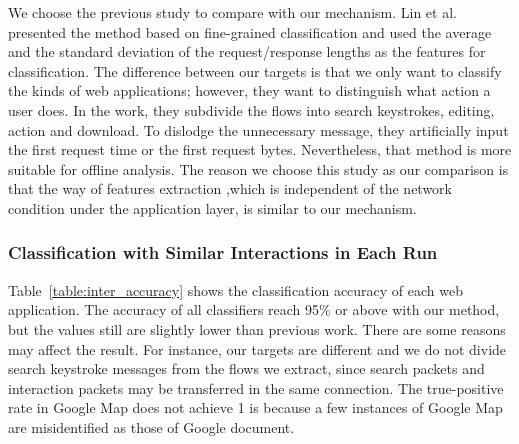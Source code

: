 \documentclass[preprint,12pt]{elsarticle}
\begin{document}
We choose the previous study to compare with our mechanism. Lin et al. presented the method based on fine-grained classification and used the average and the standard deviation of the request/response lengths as the features for classification. The difference between our targets is that we only want to classify the kinds of web applications; however, they want to distinguish what action a user does. In the work, they subdivide the flows into search keystrokes, editing, action and download. To dislodge the unnecessary message, they artificially input the first request time or the first request bytes. Nevertheless, that method is more suitable for offline analysis. The reason we choose this study as our comparison is that the way of features extraction ,which is independent of the network condition under the application layer, is similar to our mechanism.

\subsubsection{Classification with Similar Interactions in Each Run}
Table~\ref{table:inter_accuracy} shows the classification accuracy of each web application. The accuracy of all classifiers reach 95\% or above with our method, but the values still are slightly lower than previous work. There are some reasons may affect the result. For instance, our targets are different and we do not divide search keystroke messages from the flows we extract, since search packets and interaction packets may be transferred in the same connection. The true-positive rate in Google Map does not achieve 1 is because a few instances of Google Map are misidentified as those of Google document.
\end{document}
